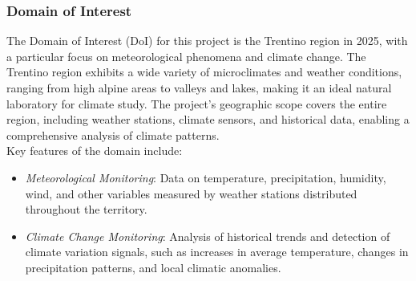 \subsubsection{Domain of Interest}
The Domain of Interest (DoI) for this project is the Trentino region in 2025, with a particular focus on meteorological phenomena and climate change. The Trentino region exhibits a wide variety of microclimates and weather conditions, ranging from high alpine areas to valleys and lakes, making it an ideal natural laboratory for climate study. The project’s geographic scope covers the entire region, including weather stations, climate sensors, and historical data, enabling a comprehensive analysis of climate patterns.\\
Key features of the domain include:
\begin{itemize}
    \item \textit{Meteorological Monitoring}: Data on temperature, precipitation, humidity, wind, and other variables measured by weather stations distributed throughout the territory.
    \item \textit{Climate Change Monitoring}: Analysis of historical trends and detection of climate variation signals, such as increases in average temperature, changes in precipitation patterns, and local climatic anomalies.
\end{itemize}


